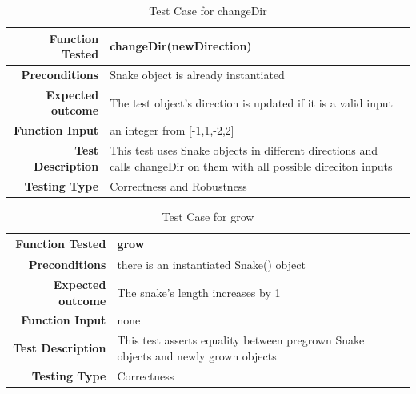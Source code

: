 \documentclass[12pt]{article}
\begin{document}
\begin{center}
	\begin{longtable}{ | r | p{4cm} | p{10cm} }
	\caption{Test Case for changeDir} \\ \hline \label{TblInputVar} 
	\textbf{Function Tested} & changeDir(newDirection)\\ \hline
	\textbf{Preconditions} & Snake object is already instantiated \\ \hline
	\textbf{Expected outcome} & The test object's direction is updated if it is a valid input \\ \hline
	\textbf{Function Input} & an integer from [-1,1,-2,2] \\ \hline
	\textbf{Test Description} & This test uses Snake objects in different directions and calls changeDir on them with all possible direciton inputs\\ \hline
	\textbf{Testing Type} & Correctness and Robustness\\ \hline
	
	\end{longtable}
\end{center}

\begin{center}
	\begin{longtable}{ | r | p{4cm} | p{10cm} }
	\caption{Test Case for grow} \\ \hline \label{TblInputVar} 
	\textbf{Function Tested} & grow\\ \hline
	\textbf{Preconditions} & there is an instantiated Snake() object \\ \hline
	\textbf{Expected outcome} & The snake's length increases by 1 \\ \hline
	\textbf{Function Input} & none \\ \hline
	\textbf{Test Description} & This test asserts equality between pregrown Snake objects and newly grown objects\\ \hline
	\textbf{Testing Type} & Correctness\\ \hline
	
	\end{longtable}
\end{center}
\end{document}
